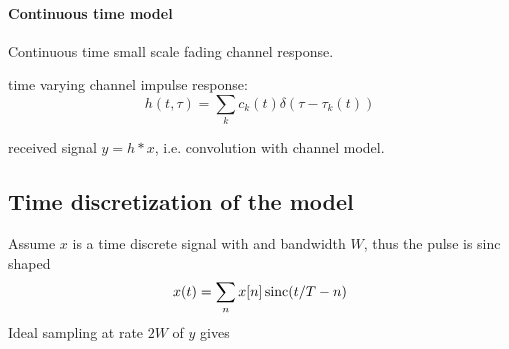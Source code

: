 
\paragraph{Continuous time model}

Continuous time small scale fading channel response.

time varying channel impulse response:
\begin{equation}
	h(t, \tau) = \sum_k c_k (t) \delta(\tau - \tau_k(t))
\end{equation}

received signal \(y = h * x\), i.e. convolution with channel model. 

\subsection{Time discretization of the model}


Assume \(x\) is a time discrete signal with and bandwidth \(W\), thus the pulse is sinc shaped
\begin{equation}
	x(t) = \sum_n x[n] \operatorname{sinc}(t/T - n)
\end{equation}
Ideal sampling at rate \(2W\) of \(y\) gives
